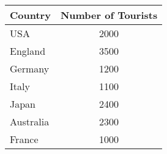    \begin{tabular}{|l|c|}
\hline
\textbf{Country} & \textbf{Number of Tourists} \\
\hline
USA & 2000 \\
\hline
England & 3500 \\
\hline
Germany & 1200 \\
\hline
Italy & 1100 \\
\hline
Japan & 2400 \\
\hline
Australia & 2300 \\
\hline
France & 1000 \\
\hline
\end{tabular}